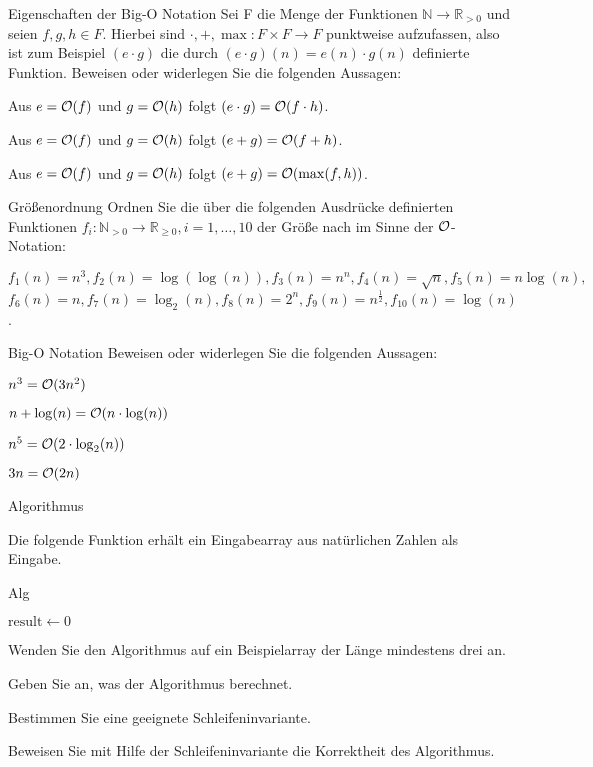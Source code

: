 \documentclass{exercisesheet}
\begin{document}
\begin{eexercises}{Eigenschaften der Big-O Notation}{
    Sei F die Menge der Funktionen $\mathbb{N} \rightarrow \mathbb{R}_{>0}$ und seien $f, g, h \in F$.
    Hierbei sind $\cdot, +, \max : F \times F \rightarrow F$ punktweise aufzufassen, also ist zum Beispiel $(e \cdot g)$ die durch $(e \cdot g)(n) = e(n) \cdot g(n)$ definierte Funktion.
    Beweisen oder widerlegen Sie die folgenden Aussagen:
  }
  \item Aus $e = \mathcal{O}(f)$ und $g = \mathcal{O}(h)$ folgt $(e \cdot g) = \mathcal{O}(f \cdot h)$.
  \item Aus $e = \mathcal{O}(f)$ und $g = \mathcal{O}(h)$ folgt $(e + g) = \mathcal{O}(f + h)$.
  \item Aus $e = \mathcal{O}(f)$ und $g = \mathcal{O}(h)$ folgt $(e + g) = \mathcal{O}(\max(f,h))$.
\end{eexercises}

\begin{exercise}{Größenordnung}
  Ordnen Sie die über die folgenden Ausdrücke definierten Funktionen $f_i : \mathbb{N}_{>0} \rightarrow \mathbb{R}_{\geq 0}, i = 1, \ldots, 10$ der Größe nach im Sinne der $\mathcal{O}$-Notation:
  \begin{center}
    $f_1(n) = n^3, f_2(n) = \log(\log(n)), f_3(n) = n^n, f_4(n) = \sqrt{n}, f_5(n) = n \log(n),$
    $f_6(n) = n, f_7(n) = \log_2(n), f_8(n) = 2^n, f_9(n) = n^{\frac{1}{2}}, f_{10}(n) = \log(n)$.
  \end{center}
\end{exercise}

\begin{eexercises}{Big-O Notation}{
    Beweisen oder widerlegen Sie die folgenden Aussagen:
  }
  \item $n^3 = \mathcal{O}(3n^2)$
  \item $n + \log(n) = \mathcal{O}(n \cdot \log(n))$
  \item $n^5 = \mathcal{O}(2 \cdot \log_2(n))$
  \item $3n = \mathcal{O}(2n)$
\end{eexercises}

\begin{eexercises}{Algorithmus}{
    Die folgende Funktion erhält ein Eingabearray aus natürlichen Zahlen als Eingabe.
    \begin{algorithm}[ht]
      \caption{Alg}
      $\text{result} \gets 0$ \\
    \end{algorithm}
  }
  \item Wenden Sie den Algorithmus auf ein Beispielarray der Länge mindestens drei an.
  \item Geben Sie an, was der Algorithmus berechnet.
  \item Bestimmen Sie eine geeignete Schleifeninvariante.
  \item Beweisen Sie mit Hilfe der Schleifeninvariante die Korrektheit des Algorithmus.
\end{eexercises}
\end{document}
